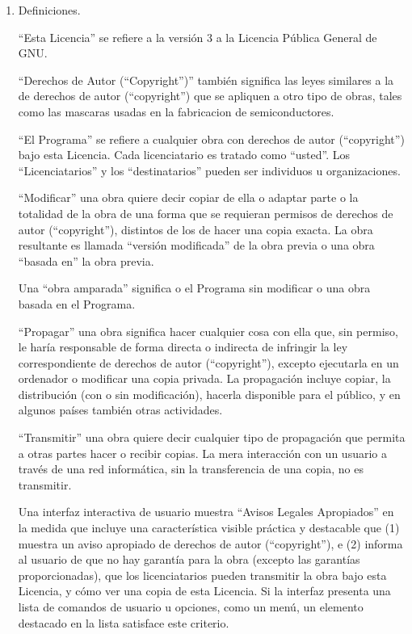 \documentclass[11pt]{article}
\begin{document}
\begin{enumerate}

\addtocounter{enumi}{-1}

\item Definiciones.

``Esta Licencia'' se refiere a la versi\'{o}n 3 a la Licencia P\'{u}blica 
General de GNU.

``Derechos de Autor (``Copyright'')'' tambi\'{e}n significa las leyes similares a la de derechos de autor (``copyright'') 
que se apliquen a otro tipo de obras, tales como las mascaras usadas 
en la fabricacion de semiconductores.

``El Programa'' se refiere a cualquier obra con derechos de autor (``copyright'') bajo esta 
Licencia.  Cada licenciatario es tratado como ``usted''. Los 
``Licenciatarios'' y los ``destinatarios'' pueden ser individuos 
u organizaciones.

``Modificar'' una obra quiere decir copiar de ella o adaptar parte o la 
totalidad de la obra de una forma que se requieran permisos de derechos de autor (``copyright''), 
distintos de los de hacer una copia exacta.  La obra resultante es 
llamada ``versi\'{o}n modificada'' de la obra previa o una obra ``basada en'' 
la obra previa.

Una ``obra amparada'' significa o el Programa sin modificar o una obra 
basada en el Programa.

``Propagar'' una obra significa hacer cualquier cosa con ella que, sin
permiso, le har\'{i}a responsable de forma directa o indirecta de infringir
la ley correspondiente de derechos de autor (``copyright''), excepto ejecutarla en un ordenador
o modificar una copia privada.  La propagaci\'{o}n incluye copiar, la 
distribuci\'{o}n (con o sin modificaci\'{o}n), hacerla disponible para el 
p\'{u}blico, y en algunos pa\'{i}ses tambi\'{e}n otras actividades.

``Transmitir'' una obra quiere decir cualquier tipo de propagaci\'{o}n que 
permita a otras partes hacer o recibir copias.  La mera interacci\'{o}n con
un usuario a trav\'{e}s de una red inform\'{a}tica, sin la transferencia de una 
copia, no es transmitir.

Una interfaz interactiva de usuario muestra ``Avisos Legales Apropiados''
en la medida que incluye una caracter\'{i}stica visible pr\'{a}ctica y 
destacable que (1) muestra un aviso apropiado de derechos de autor (``copyright''), e (2)
informa al usuario de que no hay garant\'{i}a para la obra (excepto las 
garant\'{i}as proporcionadas), que los licenciatarios pueden transmitir la 
obra bajo esta Licencia, y c\'{o}mo ver una copia de esta Licencia. 
Si la interfaz presenta una lista de comandos de usuario u opciones, 
como un men\'{u}, un elemento destacado en la lista satisface este criterio.


\end{enumerate}
\end{document}
